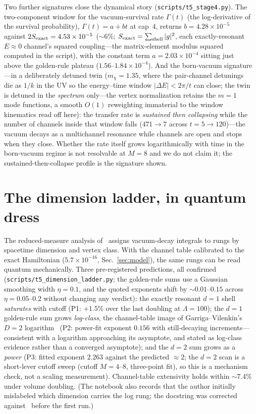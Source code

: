\documentclass[11pt]{article}
\begin{document}
Two further signatures close the dynamical story
(\texttt{scripts/t5\_stage4.py}). The two-component window for the
vacuum-survival rate $\Gamma(t)$ (the log-derivative of the survival
probability), $\Gamma(t)=a+bt$ at cap~4, returns $b=4.28\times10^{-5}$ against
$2S_{\rm exact}=4.53\times10^{-5}$ (${\sim}6\%$; $S_{\rm exact}=\sum_{\rm shell}|g|^{2}$, each exactly-resonant $E\!\approx\!0$ channel's squared coupling---the matrix-element modulus squared computed in the script), with the constant
term $a=2.03\times10^{-4}$ sitting just above the golden-rule plateau
($1.56$--$1.84\times10^{-4}$). And the born-vacuum signature---in a deliberately detuned twin
($m_{\chi}=1.35$, where the pair-channel detunings die as $1/k$ in the
UV so the energy--time window $|\Delta E|<2\pi/t$ can close; the twin is
detuned in the \emph{spectrum} only---the vertex normalization retains
the $m=1$ mode functions, a smooth $O(1)$ reweighting immaterial to the
window kinematics read off here): the
transfer rate is \emph{sustained then collapsing} while the number of
channels inside that window falls ($471\to7$ across $t=5\to120$)---the
vacuum decays as a multichannel resonance while channels are open and
stops when they close. Whether the rate itself grows logarithmically with
time in the born-vacuum regime is not resolvable at $M=8$ and we
do not claim it; the sustained-then-collapse profile is the
signature shown.

\section{The dimension ladder, in quantum dress}
\label{sec:ladder}

The reduced-measure analysis of~\cite{instantaneous} assigns
vacuum-decay integrals to rungs by spacetime dimension and vertex
class. With the channel table calibrated to the exact Hamiltonian
($5.7\times10^{-16}$, Sec.~\ref{sec:model}), the same rungs can
be read quantum mechanically. Three pre-registered predictions,
all confirmed (\texttt{scripts/t5\_dimension\_ladder.py}; the
golden-rule sums use a Gaussian smoothing width $\eta=0.1$, and the
quoted exponents shift by ${\sim}0.01$--$0.15$ across
$\eta=0.05$--$0.2$ without changing any verdict):
the exactly resonant $d=1$ shell \emph{saturates} with cutoff
(P1: $+1.5\%$ over the last doubling at $\Lambda=100$); the
$d=1$ golden-rule sum grows \emph{log-class}, the channel-table
image of Garriga--Vilenkin's $D=2$ logarithm~\cite{GV2013} (P2:
power-fit
exponent $0.156$ with still-decaying increments---consistent with
a logarithm approaching its asymptote, and stated as log-class
evidence rather than a converged asymptote); and the $d=2$ sum
grows as a \emph{power} (P3: fitted exponent $2.263$ against the
predicted ${\approx}2$; the $d=2$ scan is a short-lever cutoff sweep
(cutoff $M=4\text{--}8$, three-point fit), so this
is a mechanism check, not a scaling measurement). Channel-table
extensivity holds within ${\sim}7.4\%$ under volume doubling. (The
notebook also records that the author initially mislabeled which
dimension carries the log rung; the docstring was corrected
against~\cite{instantaneous} before the first run.)
\end{document}
